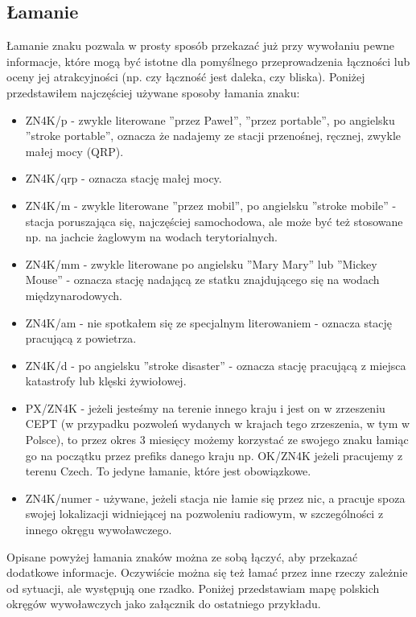 \documentclass[a4paper,11pt]{article}
\begin{document}
\subsection{Łamanie}
Łamanie znaku pozwala w prosty sposób przekazać już przy wywołaniu pewne informacje, które mogą być istotne dla pomyślnego przeprowadzenia łączności lub oceny jej atrakcyjności (np. czy łączność jest daleka, czy bliska). Poniżej przedstawiłem najczęściej używane sposoby łamania znaku:
\begin{itemize}
\item ZN4K/p - zwykle literowane ''przez Paweł'', ''przez portable'', po angielsku ''stroke portable'', oznacza że nadajemy ze stacji przenośnej, ręcznej, zwykle małej mocy (QRP).
\item ZN4K/qrp - oznacza stację małej mocy.
\item ZN4K/m - zwykle literowane ''przez mobil'', po angielsku ''stroke mobile'' - stacja poruszająca się, najczęściej samochodowa, ale może być też stosowane np. na jachcie żaglowym na wodach terytorialnych.
\item ZN4K/mm - zwykle literowane po angielsku ''Mary Mary'' lub ''Mickey Mouse'' - oznacza stację nadającą ze statku znajdującego się na wodach międzynarodowych.
\item ZN4K/am - nie spotkałem się ze specjalnym literowaniem - oznacza stację pracującą z powietrza.
\item ZN4K/d - po angielsku ''stroke disaster'' - oznacza stację pracującą z miejsca katastrofy lub klęski żywiołowej.
\item PX/ZN4K - jeżeli jesteśmy na terenie innego kraju i jest on w zrzeszeniu CEPT (w przypadku pozwoleń wydanych w krajach tego zrzeszenia, w tym w Polsce), to przez okres 3 miesięcy możemy korzystać ze swojego znaku łamiąc go na początku przez prefiks danego kraju np. OK/ZN4K jeżeli pracujemy z terenu Czech. To jedyne łamanie, które jest obowiązkowe.
\item ZN4K/numer - używane, jeżeli stacja nie łamie się przez nic, a pracuje spoza swojej lokalizacji widniejącej na pozwoleniu radiowym, w szczególności z innego okręgu wywoławczego.
\end{itemize}
Opisane powyżej łamania znaków można ze sobą łączyć, aby przekazać dodatkowe informacje. Oczywiście można się też łamać przez inne rzeczy zależnie od sytuacji, ale występują one rzadko. Poniżej przedstawiam mapę polskich okręgów wywoławczych jako załącznik do ostatniego przykładu.
\end{document}
